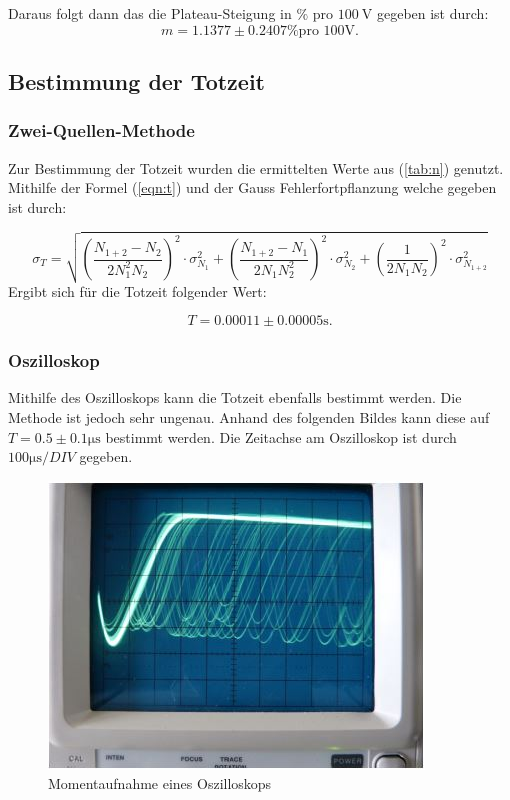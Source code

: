     Daraus folgt dann das die Plateau-Steigung in $\si{\percent}$ pro $\SI{100}{\volt}$ gegeben ist durch:
    \begin{equation*}
    m = 1.1377 \pm 0.2407 \si{\percent} \text{pro 100V}.
    \end{equation*}




\newpage
\subsection{Bestimmung der Totzeit}
    \subsubsection{Zwei-Quellen-Methode}
    Zur Bestimmung der Totzeit wurden die ermittelten Werte aus (\ref{tab:n}) genutzt. Mithilfe der Formel (\ref{eqn:t}) und der Gauss Fehlerfortpflanzung welche gegeben ist durch:

    \begin{equation}
    \label{eqn:gauß}
    \sigma_T = \sqrt{ \left(\frac{N_{1+2}-N_{2}}{2N_{1}^{2}N_{2}}\right)^2 \cdot \sigma_{N_{1}}^2+ \left(\frac{N_{1+2}-N_{1}}{2N_{1}N_{2}^{2}}\right)^2 \cdot \sigma_{N_{2}}^2+\left(\frac{1}{2N_1N_2}\right)^2 \cdot \sigma_{N_{1+2}}^2} 
    \end{equation}
\noindent
    Ergibt sich für die Totzeit folgender Wert:

    \begin{equation*}
    T = 0.00011 \pm 0.00005 \si{\second}.
    \end{equation*}



    \subsubsection{Oszilloskop}
    Mithilfe des Oszilloskops kann die Totzeit ebenfalls bestimmt werden. Die Methode ist jedoch sehr ungenau. Anhand des folgenden Bildes kann diese auf $T = 0.5 \pm 0.1 \si{\micro\second}$ 
    bestimmt werden. Die Zeitachse am Oszilloskop ist durch $100 \si{\micro\second}/DIV$ gegeben.
    \begin{figure}
	\centering
	\includegraphics[width=0.8\linewidth]{Daten/c.JPG}
	\caption{Momentaufnahme eines Oszilloskops}
    \end{figure}

